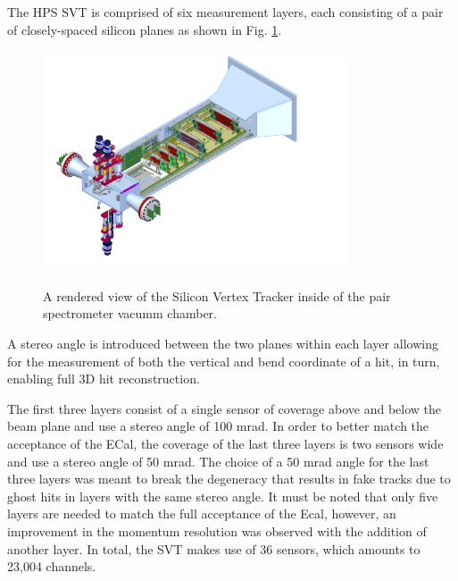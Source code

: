 The HPS SVT is comprised of six measurement layers, each consisting of a pair of
closely-spaced silicon planes as shown in Fig. \ref{fig:svt_layout_render}.
\begin{figure}[h]
    \centering
    \caption{A rendered view of the Silicon Vertex Tracker inside of the pair
             spectrometer vacumm chamber.}
    \includegraphics[width=0.8\textwidth]{images/svt_layout_render.png}
    \label{fig:svt_layout_render}
\end{figure}
A stereo angle is introduced between the two planes within each layer allowing
for the measurement of both the vertical and bend coordinate of a hit, in turn, 
enabling full 3D hit reconstruction.  

The first three layers consist of a single sensor of coverage above and below
the beam plane and use a stereo angle of 100 mrad. In order to better match the
acceptance of the ECal, the coverage of the last three layers is two sensors 
wide and use a stereo angle of 50 mrad.  The choice of a 50 mrad angle for the
last three layers was meant to break the degeneracy that results in fake tracks
due to ghost hits in layers with the same stereo angle.  It must be noted that
only five layers are needed to match the full acceptance of the Ecal, however,
an improvement in the momentum resolution was observed with the addition of 
another layer.  In total, the SVT makes use of 36 sensors, which amounts to 
23,004 channels.


